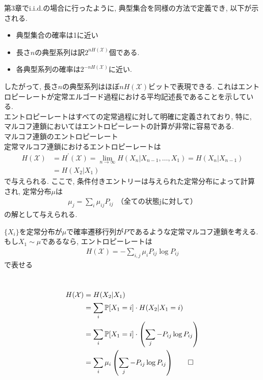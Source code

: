 \documentclass[a4j]{jsarticle}
\begin{document}
第3章でi.i.d.の場合に行ったように, 典型集合を同様の方法で定義でき, 以下が示される.
\begin{itemize}
	\item 典型集合の確率は1に近い
	\item 長さ$n$の典型系列は訳$2^{nH(\mathcal{X})}$個である.
	\item 各典型系列の確率は$2^{-nH(\mathcal{X})}$に近い.
\end{itemize}
したがって, 長さ$n$の典型系列はほぼ$nH(\mathcal{X})$ビットで表現できる. これはエントロピーレートが定常エルゴード過程における平均記述長であることを示している.\\


エントロピーレートはすべての定常過程に対して明確に定義されており, 特に, マルコフ連鎖においてはエントロピーレートの計算が非常に容易である.\\

 マルコフ連鎖のエントロピーレート\\

定常マルコフ連鎖におけるエントロピーレートは
\begin{align}
	H(\mathcal{X}) & = H^\prime(\mathcal{X}) = \lim_{n \rightarrow \infty} H(X_n | X_{n-1}, \ldots, X_1) = H(X_n | X_{n-1}) \\
	               & = H(X_2 | X_1)
\end{align}
で与えられる. ここで, 条件付きエントリーは与えられた定常分布によって計算され, 定常分布$\mu$は
\begin{align}
	\mu_j = \sum_{i} \mu_{ij}P_{ij} \:\: \text{（全ての状態jに対して）}
\end{align}
の解として与えられる.\\

\begin{itembox}[l]{}
	$\{X_i\}$を定常分布が$\mu$で確率遷移行列が$P$であるような定常マルコフ連鎖を考える. もし$X_1 \sim \mu$であるなら, エントロピーレートは
	\begin{align}
		H(\mathcal{X}) = - \sum_{i, j} \mu_i P_{ij} \log P_{ij}
	\end{align}
	で表せる
\end{itembox}\\

\begin{align}
	H(\mathcal{X}) & = H(X_2|X_1)                                                                           \\
	               & = \sum_{i} \mathbb{P}[X_1 = i] \cdot H(X_2 | X_1 = i)                                  \\
	               & =       \sum_{i} \mathbb{P}[X_1 = i] \cdot \left( \sum_{j} -P_{ij} \log P_{ij} \right)
	\\
	               & = \sum_{i} \mu_{i} \left( \sum_{j} -P_{ij} \log P_{ij} \right) \qed
\end{align}\\
\end{document}

